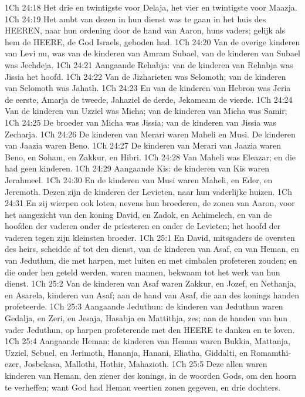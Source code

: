 1Ch 24:18  Het drie en twintigste voor Delaja, het vier en twintigste voor Maazja.
1Ch 24:19  Het ambt van dezen in hun dienst was te gaan in het huis des HEEREN, naar hun ordening door de hand van Aaron, huns vaders; gelijk als hem de HEERE, de God Israels, geboden had.
1Ch 24:20  Van de overige kinderen van Levi nu, was van de kinderen van Amram Subael, van de kinderen van Subael was Jechdeja.
1Ch 24:21  Aangaande Rehabja: van de kinderen van Rehabja was Jissia het hoofd.
1Ch 24:22  Van de Jizharieten was Selomoth; van de kinderen van Selomoth was Jahath.
1Ch 24:23  En van de kinderen van Hebron was Jeria de eerste, Amarja de tweede, Jahaziel de derde, Jekameam de vierde.
1Ch 24:24  Van de kinderen van Uzziel was Micha; van de kinderen van Micha was Samir;
1Ch 24:25  De broeder van Micha was Jissia; van de kinderen van Jissia was Zecharja.
1Ch 24:26  De kinderen van Merari waren Maheli en Musi. De kinderen van Jaazia waren Beno.
1Ch 24:27  De kinderen van Merari van Jaazia waren Beno, en Soham, en Zakkur, en Hibri.
1Ch 24:28  Van Maheli was Eleazar; en die had geen kinderen.
1Ch 24:29  Aangaande Kis: de kinderen van Kis waren Jerahmeel.
1Ch 24:30  En de kinderen van Musi waren Maheli, en Eder, en Jeremoth. Dezen zijn de kinderen der Levieten, naar hun vaderlijke huizen.
1Ch 24:31  En zij wierpen ook loten, nevens hun broederen, de zonen van Aaron, voor het aangezicht van den koning David, en Zadok, en Achimelech, en van de hoofden der vaderen onder de priesteren en onder de Levieten; het hoofd der vaderen tegen zijn kleinsten broeder.
1Ch 25:1  En David, mitsgaders de oversten des heirs, scheidde af tot den dienst, van de kinderen van Asaf, en van Heman, en van Jeduthun, die met harpen, met luiten en met cimbalen profeteren zouden; en die onder hen geteld werden, waren mannen, bekwaam tot het werk van hun dienst.
1Ch 25:2  Van de kinderen van Asaf waren Zakkur, en Jozef, en Nethanja, en Asarela, kinderen van Asaf; aan de hand van Asaf, die aan des konings handen profeteerde.
1Ch 25:3  Aangaande Jeduthun: de kinderen van Jeduthun waren Gedalja, en Zeri, en Jesaja, Hasabja en Mattithja, zes; aan de handen van hun vader Jeduthun, op harpen profeterende met den HEERE te danken en te loven.
1Ch 25:4  Aangaande Heman: de kinderen van Heman waren Bukkia, Mattanja, Uzziel, Sebuel, en Jerimoth, Hananja, Hanani, Eliatha, Giddalti, en Romamthi-ezer, Josbekasa, Mallothi, Hothir, Mahazioth.
1Ch 25:5  Deze allen waren kinderen van Heman, den ziener des konings, in de woorden Gods, om den hoorn te verheffen; want God had Heman veertien zonen gegeven, en drie dochters.

